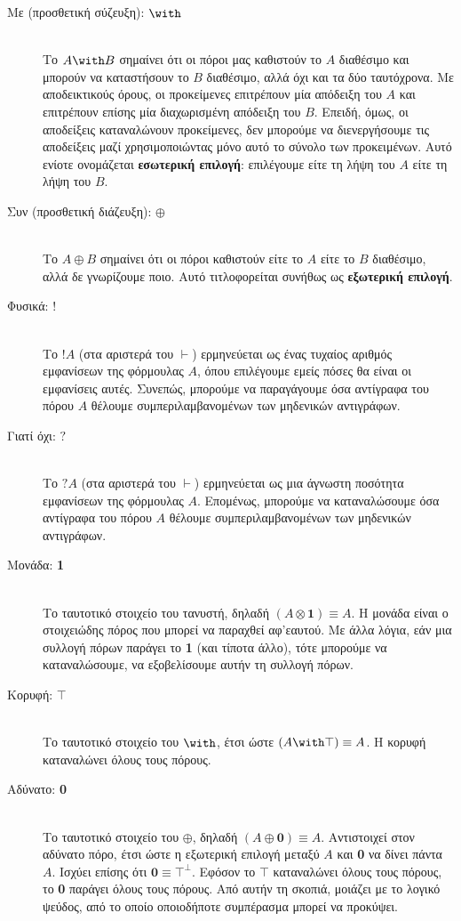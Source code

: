 \documentclass [a4paper,11pt] {book}
\theoremstyle{definition}
\theoremstyle{definition}
\begin{document}
\begin{description}
  \item[Με (προσθετική σύζευξη): $\with$] \hfill \\
  Το $A\with B$ σημαίνει ότι οι πόροι μας καθιστούν το $A$ διαθέσιμο και μπορούν να καταστήσουν το $B$ διαθέσιμο, αλλά όχι και τα δύο ταυτόχρονα. Με αποδεικτικούς όρους, οι προκείμενες επιτρέπουν μία απόδειξη του $A$ και επιτρέπουν επίσης μία διαχωρισμένη απόδειξη του $B$. Επειδή, όμως, οι αποδείξεις καταναλώνουν προκείμενες, δεν μπορούμε να διενεργήσουμε τις αποδείξεις μαζί χρησιμοποιώντας μόνο αυτό το σύνολο των προκειμένων. Αυτό ενίοτε ονομάζεται \textbf{εσωτερική επιλογή}: επιλέγουμε είτε τη λήψη του $A$ είτε τη λήψη του $B$.
  
  \item[Συν (προσθετική διάζευξη): $\oplus$] \hfill \\
  Το $A\oplus B$ σημαίνει ότι οι πόροι καθιστούν είτε το $A$ είτε το $B$ διαθέσιμο, αλλά δε γνωρίζουμε ποιο. Αυτό τιτλοφορείται συνήθως ως \textbf{εξωτερική επιλογή}.
  
  \item[Φυσικά: $!$] \hfill \\
  Το $!A$ (στα αριστερά του $\vdash$) ερμηνεύεται ως ένας τυχαίος αριθμός εμφανίσεων της φόρμουλας $A$, όπου επιλέγουμε εμείς πόσες θα είναι οι εμφανίσεις αυτές. Συνεπώς, μπορούμε να παραγάγουμε όσα αντίγραφα του πόρου $A$ θέλουμε συμπεριλαμβανομένων των μηδενικών αντιγράφων.
   
   \item[Γιατί όχι: $?$] \hfill \\
	Το $?A$ (στα αριστερά του $\vdash$) ερμηνεύεται ως μια άγνωστη ποσότητα εμφανίσεων της φόρμουλας $A$. Επομένως, μπορούμε να καταναλώσουμε όσα αντίγραφα του πόρου $A$ θέλουμε συμπεριλαμβανομένων των μηδενικών αντιγράφων.
   
   \item[Μονάδα: \textbf{1}] \hfill \\
   Το ταυτοτικό στοιχείο του τανυστή, δηλαδή $(A\otimes \textbf{1})\equiv A$. Η μονάδα είναι ο στοιχειώδης πόρος που μπορεί να παραχθεί αφ'εαυτού. Με άλλα λόγια, εάν μια συλλογή πόρων παράγει το \textbf{1} (και τίποτα άλλο), τότε μπορούμε να καταναλώσουμε, να εξοβελίσουμε αυτήν τη συλλογή πόρων.
   \item[Κορυφή: $\top$] \hfill \\
   Το ταυτοτικό στοιχείο του $\with$, έτσι ώστε $(A\with\top)\equiv A$. Η κορυφή καταναλώνει όλους τους πόρους.
   \item[Αδύνατο: \textbf{0}] \hfill \\
   Το ταυτοτικό στοιχείο του $\oplus$, δηλαδή $(A\oplus\textbf{0})\equiv A$. Αντιστοιχεί στον αδύνατο πόρο, έτσι ώστε η εξωτερική επιλογή μεταξύ $A$ και \textbf{0} να δίνει πάντα $A$. Ισχύει επίσης ότι $\textbf{0}\equiv \top^{\bot}$. Εφόσον το $\top$ καταναλώνει όλους τους πόρους, το \textbf{0} παράγει όλους τους πόρους. Από αυτήν τη σκοπιά, μοιάζει με το λογικό ψεύδος, από το οποίο οποιοδήποτε συμπέρασμα μπορεί να προκύψει.
      

\end{description}
\end{document}
